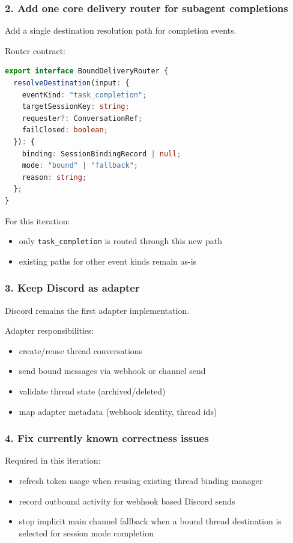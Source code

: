 \subsubsection{2. Add one core delivery router for subagent completions}


Add a single destination resolution path for completion events.

Router contract:

\begin{lstlisting}[language=typescript]
export interface BoundDeliveryRouter {
  resolveDestination(input: {
    eventKind: "task_completion";
    targetSessionKey: string;
    requester?: ConversationRef;
    failClosed: boolean;
  }): {
    binding: SessionBindingRecord | null;
    mode: "bound" | "fallback";
    reason: string;
  };
}
\end{lstlisting}


For this iteration:

\begin{itemize}
  \item only \texttt{task\_completion} is routed through this new path
  \item existing paths for other event kinds remain as-is
\end{itemize}


\subsubsection{3. Keep Discord as adapter}


Discord remains the first adapter implementation.

Adapter responsibilities:

\begin{itemize}
  \item create/reuse thread conversations
  \item send bound messages via webhook or channel send
  \item validate thread state (archived/deleted)
  \item map adapter metadata (webhook identity, thread ids)
\end{itemize}


\subsubsection{4. Fix currently known correctness issues}


Required in this iteration:

\begin{itemize}
  \item refresh token usage when reusing existing thread binding manager
  \item record outbound activity for webhook based Discord sends
  \item stop implicit main channel fallback when a bound thread destination is selected for session mode completion
\end{itemize}


